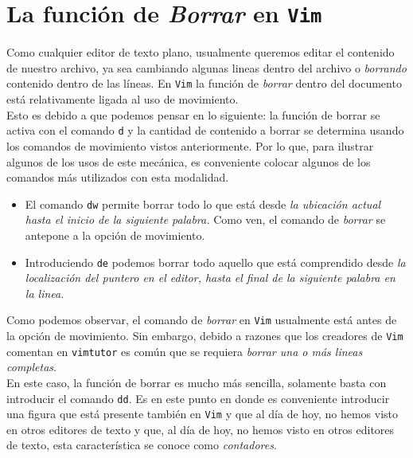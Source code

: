 \documentclass[10pt]{article}
\begin{document}
\section{La función de \textit{Borrar} en \texttt{Vim}}
Como cualquier editor de texto plano, usualmente queremos editar el contenido de nuestro archivo, ya sea cambiando algunas lineas dentro del archivo o \textit{borrando} contenido dentro de las líneas. En \texttt{Vim} la función de \textit{borrar} dentro del documento está relativamente ligada al uso de movimiento.\\
Esto es debido a que podemos pensar en lo siguiente: la función de borrar se activa con el comando \texttt{d} y la cantidad de contenido a borrar se determina usando los comandos de movimiento vistos anteriormente. Por lo que, para ilustrar algunos de los usos de este mecánica, es conveniente colocar algunos de los comandos más utilizados con esta modalidad. 
\begin{itemize}
	\item El comando \texttt{dw} permite borrar todo lo que está desde \textit{la ubicación actual hasta el inicio de la siguiente palabra.} Como ven, el comando de \textit{borrar} se antepone a la opción de movimiento.
	\item Introduciendo \texttt{de} podemos borrar todo aquello que está comprendido desde \textit{la localización del puntero en el editor, hasta el final de la siguiente palabra en la linea}. 
\end{itemize}
Como podemos observar, el comando de \textit{borrar} en \texttt{Vim} usualmente está antes de la opción de movimiento. Sin embargo, debido a razones que los creadores de \texttt{Vim} comentan en \texttt{vimtutor} es común que se requiera \textit{borrar una o más lineas completas}. \\
En este caso, la función de borrar es mucho más sencilla, solamente basta con introducir el comando \texttt{dd}. Es en este punto en donde es conveniente introducir una figura que está presente también en \texttt{Vim} y que al día de hoy, no hemos visto en otros editores de texto y que, al día de hoy, no hemos visto en otros editores de texto, esta característica se conoce como \textit{contadores}.
\end{document}
